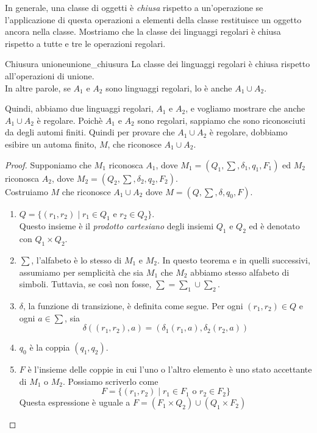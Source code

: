 \documentclass[12pt]{report}
\newcounter{theorem}
\newcommand{\nmu}{}
\begin{document}
	In generale, una classe di oggetti è \textit{chiusa} rispetto a un'operazione se l'applicazione di questa operazioni a elementi della classe restituisce un oggetto ancora nella classe. Mostriamo che la classe dei linguaggi regolari è chiusa rispetto a tutte e tre le operazioni regolari.
	\begin{theorem}{\nmu Chiusura unione}{unione_chiusura}
		La classe dei linguaggi regolari è chiusa rispetto all'operazioni di unione. \\
		In altre parole, se $A_1$ e $A_2$ sono linguaggi regolari, lo è anche $A_1 \cup A_2$.
	\end{theorem}
	Quindi, abbiamo due linguaggi regolari, $A_1$ e $A_2$, e vogliamo mostrare che anche $A_1 \cup A_2$ è regolare. Poichè $A_1$ e $A_2$ sono regolari, sappiamo che sono riconosciuti da degli automi finiti. Quindi per provare che $A_1 \cup A_2$ è regolare, dobbiamo esibire un automa finito, $M$, che riconosce $A_1 \cup A_2$.
	\begin{proof}
		Supponiamo che $M_1$ riconosca $A_1$, dove $M_1 = (Q_1, \sum, \delta_1, q_1, F_1)$ ed $M_2$ riconosca $A_2$, dove $M_2 = (Q_2, \sum, \delta_2, q_2, F_2)$. \\
		Costruiamo $M$ che riconosce $A_1 \cup A_2$ dove $M = (Q, \sum, \delta, q_0, F)$.
		\begin{enumerate}
			\item $Q = \{(r_1, r_2) \mid r_1 \in Q_1 \text{ e } r_2 \in Q_2\}$. \\
			Questo insieme è il \textit{prodotto cartesiano} degli insiemi $Q_1$ e $Q_2$ ed è denotato con $Q_1 \times Q_2$.
			\item $\sum$, l'alfabeto è lo stesso di $M_1$ e $M_2$. In questo teorema e in quelli successivi, assumiamo per semplicità che sia $M_1$ che $M_2$ abbiamo stesso alfabeto di simboli. Tuttavia, se così non fosse, $\sum = \sum_1 \cup \sum_2$.
			\item $\delta$, la funzione di transizione, è definita come segue. Per ogni $(r_1, r_2) \in Q$ e ogni $a \in \sum$, sia
			\[
			\delta((r_1, r_2), a) = (\delta_1(r_1, a), \delta_2(r_2, a))
			\]
			\item $q_0$ è la coppia $(q_1, q_2)$.
			\item $F$ è l'insieme delle coppie in cui l'uno o l'altro elemento è uno stato accettante di $M_1$ o $M_2$. Possiamo scriverlo come
			\[
			F = \{(r_1, r_2) \mid r_1 \in F_1 \text{ o } r_2 \in F_2\}
			\]
			Questa espressione è uguale a $F=(F_1 \times Q_2) \cup (Q_1 \times F_2)$
		\end{enumerate}
	\end{proof}
\end{document}
